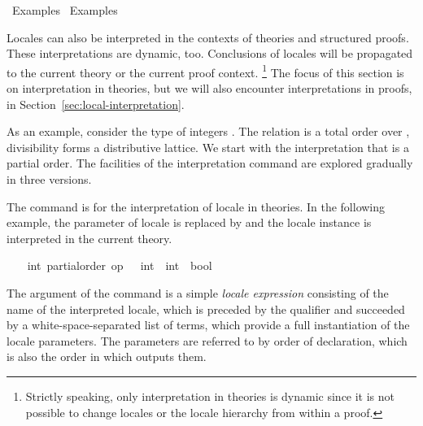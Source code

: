 %
\begin{isabellebody}%
\def\isabellecontext{Examples{\isadigit{1}}}%
%
\isadelimtheory
%
\endisadelimtheory
%
\isatagtheory
{}\isamarkupfalse%
\ Examples{}\isanewline
{}\ Examples\isanewline
{}%
\endisatagtheory
{\isafoldtheory}%
%
\isadelimtheory
%
\endisadelimtheory
%
\isamarkuptrue%
%
\begin{isamarkuptext}%
Locales can also be interpreted in the contexts of theories and
  structured proofs.  These interpretations are dynamic, too.
  Conclusions of locales will be propagated to the current theory or
  the current proof context.%
\footnote{Strictly speaking, only interpretation in theories is
  dynamic since it is not possible to change locales or the locale
  hierarchy from within a proof.}
  The focus of this section is on
  interpretation in theories, but we will also encounter
  interpretations in proofs, in
  Section~\ref{sec:local-interpretation}.

  As an example, consider the type of integers .  The
  relation  is a total order over ,
  divisibility  forms a distributive lattice.  We start with the
  interpretation that  is a partial order.  The facilities of
  the interpretation command are explored gradually in three versions.%
\end{isamarkuptext}%
\isamarkuptrue%
%
\isamarkuptrue%
%
\begin{isamarkuptext}%
The command  is for the interpretation of
  locale in theories.  In the following example, the parameter of locale
   is replaced by  and the locale instance is interpreted in the current
  theory.%
\end{isamarkuptext}%
\isamarkuptrue%
%
\isadelimvisible
\ \ %
\endisadelimvisible
%
\isatagvisible
{}\isamarkupfalse%
\ int{\isacharcolon}\ partial{\isacharunderscore}order\ {\isachardoublequoteopen}op\ {\isasymle}\ {\isacharcolon}{\isacharcolon}\ int\ {\isasymRightarrow}\ int\ {\isasymRightarrow}\ bool{\isachardoublequoteclose}%
\begin{isamarkuptxt}%
\normalsize
  The argument of the command is a simple \emph{locale expression}
  consisting of the name of the interpreted locale, which is
  preceded by the qualifier  and succeeded by a
  white-space-separated list of terms, which provide a full
  instantiation of the locale parameters.  The parameters are referred
  to by order of declaration, which is also the order in which
   outputs them.


\end{isamarkuptxt}
\end{isabellebody}
